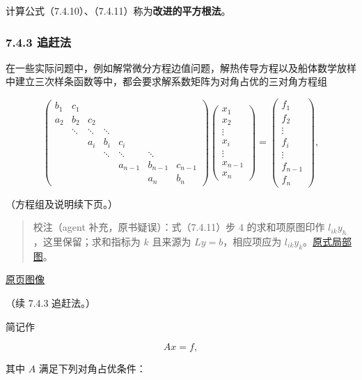 \documentclass[
  10pt,
  fontset=fandol]{ctexart}
\begin{document}
计算公式（7.4.10）、（7.4.11）称为\textbf{改进的平方根法}。

\subsubsection{7.4.3 追赶法}\label{ux8ffdux8d76ux6cd5}

在一些实际问题中，例如解常微分方程边值问题，解热传导方程以及船体数学放样中建立三次样条函数等中，都会要求解系数矩阵为对角占优的三对角方程组

\[
\begin{pmatrix}
b_1&c_1&&&&&\\
a_2&b_2&c_2&&&&\\
&\ddots&\ddots&\ddots&&&\\
&&a_i&b_i&c_i&&\\
&&&\ddots&\ddots&\ddots&\\
&&&&a_{n-1}&b_{n-1}&c_{n-1}\\
&&&&&a_n&b_n
\end{pmatrix}
\begin{pmatrix}x_1\\x_2\\\vdots\\x_i\\\vdots\\x_{n-1}\\x_n\end{pmatrix}
=
\begin{pmatrix}f_1\\f_2\\\vdots\\f_i\\\vdots\\f_{n-1}\\f_n\end{pmatrix},
\]

（方程组及说明续下页。）

\begin{quote}
校注（agent 补充，原书疑误）：式（7.4.11）步 4 的求和项原图印作 \(l_{ik}y_h\)，这里保留；求和指标为 \(k\) 且来源为 \(Ly=b\)，相应项应为 \(l_{ik}y_k\)。\href{../assets/ch07b/197-solves.png}{原式局部图}。
\end{quote}

\href{../../source-images/pdf-198.jpeg}{原页图像}

（续 7.4.3 追赶法。）

简记作

\[
Ax=f,
\tag{7.4.12}
\]

其中 \(A\) 满足下列对角占优条件：
\end{document}
